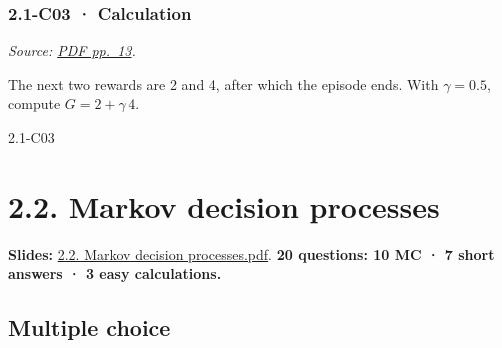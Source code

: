 \noindent\begin{minipage}{\linewidth}

\subsubsection{2.1-C03 · Calculation}\label{c03-calculation-3}

\emph{Source:
\href{../Lecture\%20Slides/2.1.\%20Introduction\%20to\%20Reinforcement\%20Learning.pdf\#page=13}{PDF
pp.~13}.}

The next two rewards are 2 and 4, after which the episode ends. With
\(\gamma=0.5\), compute \(G=2+\gamma\,4\).

\begin{solution}[26mm]{2.1-C03}

\end{solution}
\end{minipage}\par\medskip

\clearpage

\section{2.2. Markov decision
processes}\label{markov-decision-processes}

\textbf{Slides:}
\href{../Lecture\%20Slides/2.2.\%20Markov\%20decision\%20processes.pdf}{2.2.
Markov decision processes.pdf}. \textbf{20 questions: 10 MC · 7 short
answers · 3 easy calculations.}

\subsection{Multiple choice}\label{multiple-choice-4}

